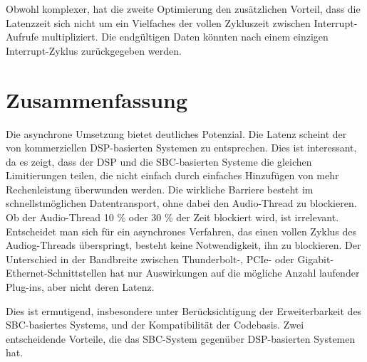 Obwohl komplexer, hat die zweite Optimierung den zusätzlichen Vorteil, dass die Latenzzeit sich nicht um ein Vielfaches der vollen Zykluszeit zwischen Interrupt-Aufrufe multipliziert. Die endgültigen Daten könnten nach einem einzigen Interrupt-Zyklus zurückgegeben werden.

\section{Zusammenfassung}

Die asynchrone Umsetzung bietet deutliches Potenzial. Die Latenz scheint der von kommerziellen DSP-basierten Systemen zu entsprechen\cite{UAD2-review}. Dies ist interessant, da es zeigt, dass der DSP und die SBC-basierten Systeme die gleichen Limitierungen teilen, die nicht einfach durch einfaches Hinzufügen von mehr Rechenleistung überwunden werden. Die wirkliche Barriere besteht im schnellstmöglichen Datentransport, ohne dabei den Audio-Thread zu blockieren. Ob der Audio-Thread 10 \% oder 30 \% der Zeit blockiert wird, ist irrelevant. Entscheidet man sich für ein asynchrones Verfahren, das einen vollen Zyklus des Audiog-Threads überspringt, besteht keine Notwendigkeit, ihn zu blockieren. Der Unterschied in der Bandbreite zwischen Thunderbolt-, PCIe- oder Gigabit-Ethernet-Schnittstellen hat nur Auswirkungen auf die mögliche Anzahl laufender Plug-ins, aber nicht deren Latenz.

Dies ist ermutigend, insbesondere unter Berücksichtigung der Erweiterbarkeit des SBC-basiertes Systems, und der Kompatibilität der Codebasis. Zwei entscheidende Vorteile, die das SBC-System gegenüber DSP-basierten Systemen hat.

